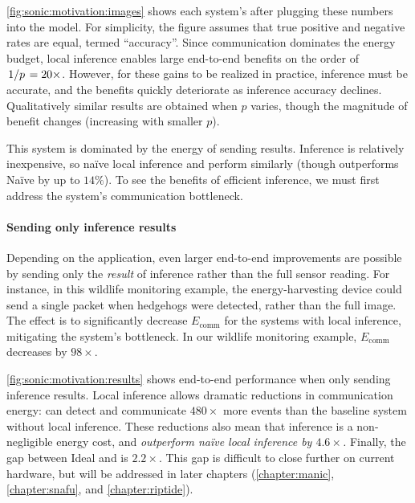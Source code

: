 \figSONICMotivateImages

\autoref{fig:sonic:motivation:images} shows each system's \metric after
plugging these numbers into the model.
%
For simplicity, the figure assumes that true positive and negative
rates are equal, termed ``accuracy''.
%
Since communication dominates the energy budget, local inference
enables large end-to-end benefits on the order of $\left.1\middle/p\right. = 20\times$.
%
However, for these gains to be realized in practice, inference must be
accurate, and the benefits quickly deteriorate as inference accuracy
declines.
%
Qualitatively similar results are obtained when $p$ varies, though the
magnitude of benefit changes (increasing with smaller $p$).

This system is dominated by the energy of sending results.
Inference is relatively inexpensive, so na\"ive local inference and \sonictails perform similarly
(though \sonictails outperforms Na\"ive by up to $14\%$).
To see the benefits of efficient inference, we must first address the system's communication bottleneck.

\paragraph{Sending only inference results}
%
Depending on the application, even larger end-to-end improvements are
possible by sending only the \emph{result} of inference rather than
the full sensor reading.
%
For instance, in this wildlife monitoring example, the
energy-harvesting device could send a single packet when hedgehogs
were detected, rather than the full image.
%
The effect is to significantly decrease $E_\text{comm}$
for the systems with local inference, mitigating the system's
bottleneck.
%
In our wildlife monitoring example, $E_\text{comm}$ decreases by $98\times$.

\figSONICMotivateResults

\autoref{fig:sonic:motivation:results} shows end-to-end performance when
only sending inference results.
%
Local inference allows dramatic reductions in communication energy:
\sonictails can detect and communicate $480\times$ more events than
the baseline system without local inference.
%
These reductions also mean that inference is a non-negligible
energy cost,
and \emph{\sonictails outperform na\"ive local inference by $4.6\times$.}
Finally, the gap between Ideal and \sonictails is $2.2\times$.
%
This gap is difficult to close further on current hardware, but will be addressed in later chapters (\autoref{chapter:manic}, \autoref{chapter:snafu}, and \autoref{chapter:riptide}).